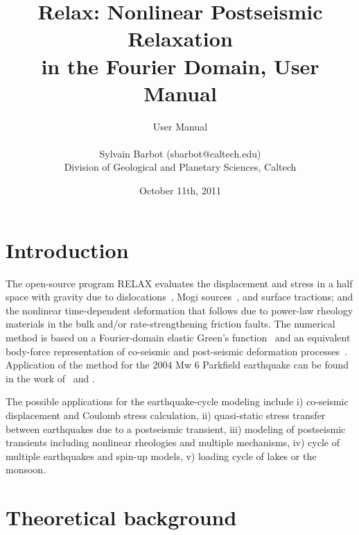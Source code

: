 \documentclass[10pt]{article}
\title{\bf Relax: Nonlinear Postseismic Relaxation\\in the Fourier Domain, User Manual}
\author
{User Manual\\
\\
\normalsize{Sylvain Barbot (sbarbot@caltech.edu)}\\
\normalsize{Division of Geological and Planetary Sciences, Caltech}\\
}
\date{October 11th, 2011}
\begin{document}
 

\maketitle 

\section{Introduction}

The open-source program RELAX evaluates the displacement and stress in a half space with gravity due to dislocations~\citep[e.g.,][]{okada92}, Mogi sources~\citep{mogi58}, and surface tractions; and the nonlinear time-dependent deformation that follows due to power-law rheology materials in the bulk and/or rate-strengthening friction faults. The numerical method is based on a Fourier-domain elastic Green's function~\citep{barbot+09b,barbot&fialko10a} and an equivalent body-force representation of co-seismic and post-seismic deformation processes~\citep{barbot+09a,barbot&fialko10b}. Application of the method for the 2004 Mw 6 Parkfield earthquake can be found in the work of~\cite{barbot+09a} and \cite{bruhat+11}. 

The possible applications for the earthquake-cycle modeling include i) co-seismic displacement and Coulomb stress calculation, ii) quasi-static stress transfer between earthquakes due to a postseismic transient, iii) modeling of postseismic transients including nonlinear rheologies and multiple mechanisms, iv) cycle of multiple earthquakes and spin-up models, v) loading cycle of lakes or the monsoon.

\tableofcontents

\section{Theoretical background}
\end{document}
